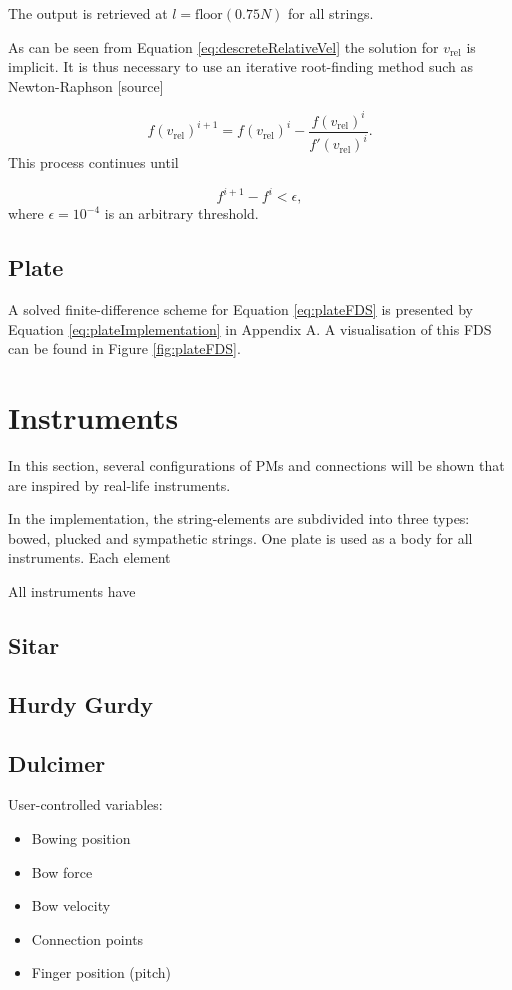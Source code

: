 \documentclass{article}
\begin{document}
The output is retrieved at $l = \text{floor}(0.75N)$ for all strings.

As can be seen from Equation \eqref{eq:descreteRelativeVel} the solution for $v_\text{rel}$ is implicit. It is thus necessary to use an iterative root-finding method such as Newton-Raphson [source]

\begin{equation}\label{eq:newtonRaphson}
    f(v_\text{rel})^{i+1} = f(v_\text{rel})^i - \frac{f(v_\text{rel})^i}{f'(v_\text{rel})^i}.
\end{equation}
This process continues until 

\begin{equation} \nonumber
    f^{i+1}-f^i < \epsilon,
\end{equation}
where $\epsilon = 10^{-4}$ is an arbitrary threshold. 
\subsection{Plate}
A solved finite-difference scheme for Equation \eqref{eq:plateFDS} is presented by Equation \eqref{eq:plateImplementation} in Appendix A. A visualisation of this FDS can be found in Figure \ref{fig:plateFDS}.

\section{Instruments}\label{sec:instruments}

In this section, several configurations of PMs and connections will be shown that are inspired by real-life instruments.

In the implementation, the string-elements are subdivided into three types: bowed, plucked and sympathetic strings. One plate is used as a body for all instruments. Each element

All instruments have 

\subsection{Sitar}

\subsection{Hurdy Gurdy}

\subsection{Dulcimer}
User-controlled variables:
\begin{itemize}
    \item Bowing position
    \item Bow force
    \item Bow velocity
    \item Connection points
    \item Finger position (pitch)
\end{itemize}
\end{document}
